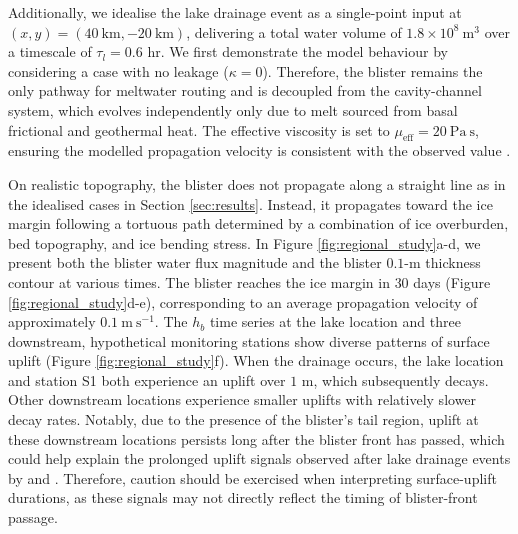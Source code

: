 \documentclass[draft]{agujournal2019}
\newcommand{\secref}[1]{Section \ref{#1}}
\newcommand{\figref}[1]{Figure \ref{#1}}
\begin{document}
Additionally, we idealise the lake drainage event as a single-point input at $(x,y)=(40~\text{km},-20~\text{km})$, delivering a total water volume of $1.8\times10^{8}~\text{m}^3$ over a timescale of $\tau_l=0.6$ hr. We first demonstrate the model behaviour by considering a case with no leakage ($\kappa=0$). Therefore, the blister remains the only pathway for meltwater routing and is decoupled from the cavity-channel system, which evolves independently only due to melt sourced from basal frictional and geothermal heat. The effective viscosity is set to $\mu_{\text{eff}}=20~\text{Pa}~\text{s}$, ensuring the modelled propagation velocity is consistent with the observed value \cite{maier2023Wintertime}.

On realistic topography, the blister does not propagate along a straight line as in the idealised cases in \secref{sec:results}. Instead, it propagates toward the ice margin following a tortuous path determined by a combination of ice overburden, bed topography, and ice bending stress. In \figref{fig:regional_study}a-d, we present both the blister water flux magnitude and the blister $0.1$-m thickness contour at various times. The blister reaches the ice margin in $30$ days (\figref{fig:regional_study}d-e), corresponding to an average propagation velocity of approximately $0.1~\text{m}~\text{s}^{-1}$. The $h_b$ time series at the lake location and three downstream, hypothetical monitoring stations show diverse patterns of surface uplift (\figref{fig:regional_study}f). When the drainage occurs, the lake location and station S1 both experience an uplift over $1$ m, which subsequently decays. Other downstream locations experience smaller uplifts with relatively slower decay rates. Notably, due to the presence of the blister's tail region, uplift at these downstream locations persists long after the blister front has passed, which could help explain the prolonged uplift signals observed after lake drainage events by  and . Therefore, caution should be exercised when interpreting surface-uplift durations, as these signals may not directly reflect the timing of blister-front passage.
\end{document}
